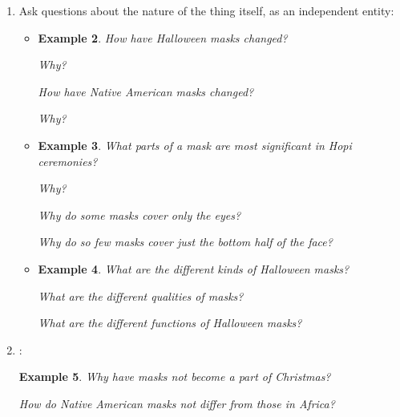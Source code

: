 \documentclass[oneside]{book}
\numberwithin{equation}{section}
\newtheorem{example}{Example}[section]
\begin{document}
\begin{enumerate}
\begin{itemize}
\begin{example}
            What do Halloween masks have to do with Mardi Gras masks?
            
            How are masks and cosmetic surgery alike?
        \end{example}
    \end{itemize}
    \item Ask questions about the nature of the thing itself, as an independent entity:
    \begin{itemize}
        \item {}
        \begin{example}
            How have Halloween masks changed?
            
            Why?
            
            How have Native American masks changed?
            
            Why?
        \end{example}
        \item {}
        \begin{example}
            What parts of a mask are most significant in Hopi ceremonies?
            
            Why?
            
            Why do some masks cover only the eyes?
            
            Why do so few masks cover just the bottom half of the face?
        \end{example}
        \item {}
        \begin{example}
            What are the different kinds of Halloween masks?
            
            What are the different qualities of masks?
            
            What are the different functions of Halloween masks?
        \end{example}
    \end{itemize}
    \item {}:
    \begin{example}
        Why have masks \emph{not} become a part of Christmas?
        
        How do Native American masks \emph{not} differ from those in Africa?
        

\end{example}
\end{enumerate}
\end{document}
